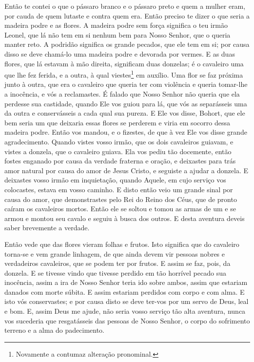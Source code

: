 Então te contei o que o pássaro branco e o pássaro preto e quem a mulher eram,
por cauda de quem lutaste e contra quem era. Então preciso te dizer o que seria
a madeira podre e as flores. A madeira podre sem força significa o teu irmão
Leonel, que lá não tem em si nenhum bem para Nosso Senhor, que o queria manter
reto. A podridão significa os grande pecados, que ele tem em si; por causa
disso se deve chamá-lo uma madeira podre e devorada por vermes. E as duas
flores, que lá estavam à mão direita, significam duas donzelas; é o cavaleiro
uma que lhe fez ferida, e a outra, à qual viestes\footnote{ Novamente a
contumaz alteração pronominal. } em auxílio. Uma flor se faz próxima
junto à outra, que era o cavaleiro que queria ter com violência e queria
tomar-lhe a inocência, e vós a reclamastes. É falado que Nosso Senhor não
queria que ela perdesse sua castidade, quando Ele vos guiou para lá, que vós as
separásseis uma da outra e conservásseis a cada qual sua pureza. E Ele vos
disse, Bohort, que ele bem seria um que deixaria essas flores se perderem e
viria em socorro dessa madeira podre. Então vos mandou, e o fizestes, de que à
vez Ele vos disse grande agradecimento. Quando vistes vosso irmão, que os dois
cavaleiros guiavam, e vistes a donzela, que o cavaleiro guiava. Ela vos pediu
tão docemente, então fostes enganado por causa da verdade fraterna e oração, e
deixastes para trás amor natural por causa do amor de Jesus Cristo, e seguiste
a ajudar a donzela. E deixastes vosso irmão em inquietação,
quando Aquele, em cujo serviço vos colocastes, estava em vosso caminho. E disto
então veio um grande sinal por causa do amor, que demonstrastes pelo Rei do
Reino dos Céus, que de pronto caíram os cavaleiros mortos. Então ele se soltou
e tomou as armas de um e se armou e montou seu cavalo e seguiu à busca dos
outros. E desta aventura deveis saber brevemente a verdade. 

Então vede que das flores vieram folhas e frutos. Isto significa que do
cavaleiro torna-se e vem grande linhagem, de que ainda devem vir pessoas nobres
e verdadeiros cavaleiros, que se podem ter por frutos. E assim se faz, pois, da
donzela. E se tivesse vindo que tivesse perdido em tão horrível pecado sua
inocência, assim a ira de Nosso Senhor teria ido sobre ambos, assim que
estariam danados com morte súbita. E assim estariam perdidos com corpo e com
alma. E isto vós conservastes; e por causa disto se deve ter-vos por um servo
de Deus, leal e bom. E, assim Deus me ajude, não seria vosso serviço tão alta
aventura, nunca vos sucederia que resgatásseis das pessoas de Nosso Senhor, o
corpo do sofrimento terreno e a alma do padecimento.

